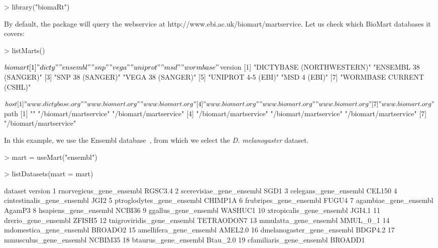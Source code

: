 \begin{Schunk}
\begin{Sinput}
> library("biomaRt")
\end{Sinput}
\end{Schunk}
%
By default, the  package will query the webservice at\newline 
http://www.ebi.ac.uk/biomart/martservice.  Let us check
which BioMart databases it covers:
%
\begin{Schunk}
\begin{Sinput}
> listMarts()
\end{Sinput}
\begin{Soutput}
$biomart
[1] "dicty"    "ensembl"  "snp"      "vega"     "uniprot"  "msd"      "wormbase"

$version
[1] "DICTYBASE (NORTHWESTERN)" "ENSEMBL 38 (SANGER)"     
[3] "SNP 38 (SANGER)"          "VEGA 38 (SANGER)"        
[5] "UNIPROT 4-5 (EBI)"        "MSD 4 (EBI)"             
[7] "WORMBASE CURRENT (CSHL)" 

$host
[1] "www.dictybase.org" "www.biomart.org"   "www.biomart.org"  
[4] "www.biomart.org"   "www.biomart.org"   "www.biomart.org"  
[7] "www.biomart.org"  

$path
[1] ""                     "/biomart/martservice" "/biomart/martservice"
[4] "/biomart/martservice" "/biomart/martservice" "/biomart/martservice"
[7] "/biomart/martservice"
\end{Soutput}
\end{Schunk}
%
In this example, we use the Ensembl database~\cite{Ensembl2006}, from
which we select the \textit{D. melanogaster} dataset.
%
\begin{Schunk}
\begin{Sinput}
> mart = useMart("ensembl")
\end{Sinput}
\end{Schunk}
% 
\begin{Schunk}
\begin{Sinput}
> listDatasets(mart = mart)
\end{Sinput}
\begin{Soutput}
                      dataset    version
1    rnorvegicus_gene_ensembl    RGSC3.4
2    scerevisiae_gene_ensembl       SGD1
3       celegans_gene_ensembl     CEL150
4  cintestinalis_gene_ensembl       JGI2
5   ptroglodytes_gene_ensembl    CHIMP1A
6      frubripes_gene_ensembl      FUGU4
7       agambiae_gene_ensembl     AgamP3
8       hsapiens_gene_ensembl     NCBI36
9        ggallus_gene_ensembl    WASHUC1
10   xtropicalis_gene_ensembl     JGI4.1
11        drerio_gene_ensembl     ZFISH5
12 tnigroviridis_gene_ensembl TETRAODON7
13      mmulatta_gene_ensembl   MMUL_0_1
14    mdomestica_gene_ensembl    BROADO2
15    amellifera_gene_ensembl    AMEL2.0
16 dmelanogaster_gene_ensembl    BDGP4.2
17     mmusculus_gene_ensembl    NCBIM35
18       btaurus_gene_ensembl   Btau_2.0
19   cfamiliaris_gene_ensembl    BROADD1
\end{Soutput}
\end{Schunk}
